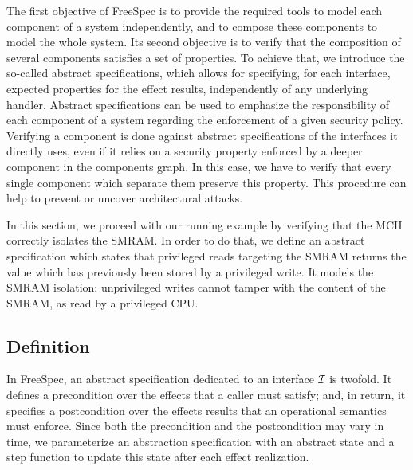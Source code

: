 The first objective of FreeSpec is to provide the required tools to model each
component of a system independently, and to compose these components to model
the whole system.
%
Its second objective is to verify that the composition of several components
satisfies a set of properties.
%
To achieve that, we introduce the so-called abstract specifications, which
allows for specifying, for each interface, expected properties for the effect
results, independently of any underlying handler.
%
Abstract specifications can be used to emphasize the responsibility
of each component of a system regarding the enforcement of a given security
policy.
%
Verifying a component is done against abstract specifications of the interfaces
it directly uses, even if it relies on a security property enforced by a deeper
component in the components graph.
%
In this case, we have to verify that every single component which separate them
preserve this property.
%
This procedure can help to prevent or uncover architectural attacks.

In this section, we proceed with our running example by verifying that the MCH
correctly isolates the SMRAM.
%
In order to do that, we define an abstract specification which states that
privileged reads targeting the SMRAM returns the value which has previously been
stored by a privileged write. It models the SMRAM isolation: unprivileged writes cannot
tamper with the content of the SMRAM, as read by a privileged CPU.

\subsection{Definition}

In FreeSpec, an abstract specification dedicated to an interface $\mathcal{I}$ is
twofold.
%
It defines a precondition over the effects that a caller must satisfy;
and, in return, it specifies a postcondition over the effects results that an
operational semantics must enforce.
%
Since both the precondition and the postcondition may vary in
time, we parameterize an abstraction specification with an abstract state and a
step function to update this state after each effect realization.

